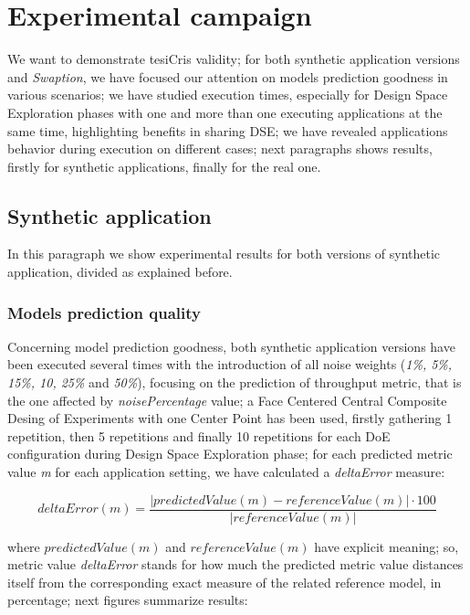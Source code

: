 \section{Experimental campaign}\label{campaign}

We want to demonstrate tesiCris validity; for both synthetic application versions and \textit{Swaption}, we have focused our attention on models prediction goodness in various scenarios; we have studied execution times, especially for Design Space Exploration phases with one and more than one executing applications at the same time, highlighting benefits in sharing DSE; we have revealed applications behavior during execution on different cases; next paragraphs shows results, firstly for synthetic applications, finally for the real one.


\subsection{Synthetic application}

In this paragraph we show experimental results for both versions of synthetic application, divided as explained before.


\subsubsection{Models prediction quality}\label{deltaErrorExplanation}

Concerning model prediction goodness, both synthetic application versions have been executed several times with the introduction of all noise weights (\textit{1\%, 5\%, 15\%, 10, 25\%} and \textit{50\%}), focusing on the prediction of throughput metric, that is the one affected by \textit{noisePercentage} value; a Face Centered Central Composite Desing of Experiments with one Center Point has been used, firstly gathering 1 repetition, then 5 repetitions and finally 10 repetitions for each DoE configuration during Design Space Exploration phase; for each predicted metric value \textit{m} for each application setting, we have calculated a \textit{deltaError} measure:

\[
deltaError(m) = \dfrac{\left\vert predictedValue(m) - referenceValue(m) \right\vert \cdot 100}{\left\vert referenceValue(m) \right\vert}
\]

where $predictedValue(m)$ and $referenceValue(m)$ have explicit meaning; so, metric value \textit{deltaError} stands for how much the predicted metric value distances itself from the corresponding exact measure of the related reference model, in percentage; next figures summarize results:





